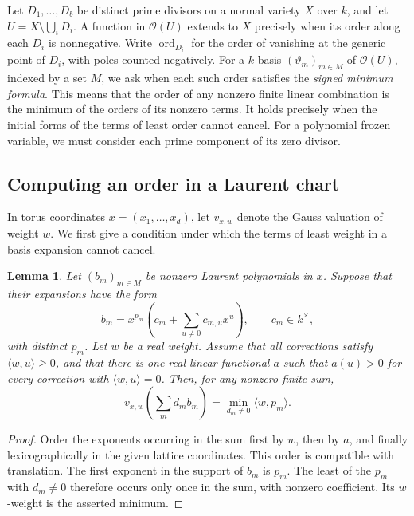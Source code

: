 \documentclass[11pt,reqno]{amsart}
\numberwithin{equation}{section}
\newtheorem{lemma}[theorem]{Lemma}
\theoremstyle{definition}
\theoremstyle{remark}
\DeclareMathOperator{\ord}{ord}
\begin{document}
Let \(D_1,\ldots,D_b\) be distinct prime divisors on a normal variety
\(X\) over \(k\), and let \(U=X\setminus\bigcup_iD_i\). A function
in \(\mathcal O(U)\) extends to \(X\) precisely when its order along
each \(D_i\) is nonnegative. Write \(\ord_{D_i}\) for the order of
vanishing at the generic point of \(D_i\), with poles counted negatively.
For a \(k\)-basis \((\vartheta_m)_{m\in M}\) of \(\mathcal O(U)\),
indexed by a set \(M\), we ask when each such order satisfies the
\emph{signed minimum formula}. This means that the order of any
nonzero finite linear combination is the minimum of the orders of its
nonzero terms. It holds precisely when the initial forms of the terms
of least order cannot cancel. For a polynomial
frozen variable, we must consider each prime component of its zero divisor.

\subsection{Computing an order in a Laurent chart}

In torus coordinates \(x=(x_1,\ldots,x_d)\), let \(v_{x,w}\) denote the
Gauss valuation of weight \(w\). We first give a condition under which
the terms of least weight in a basis expansion cannot cancel.

\begin{lemma}\label{lem:boundary-leading-independence}
Let \((b_m)_{m\in M}\) be nonzero Laurent polynomials in \(x\). Suppose
that their expansions have the form
\[ b_m=x^{p_m}\left(c_m+\sum_{u\ne0} c_{m,u}x^u\right), \qquad c_m\in k^\times, \]
with distinct \(p_m\). Let \(w\) be a real weight. Assume that all
corrections satisfy \(\langle w,u\rangle\ge0\), and that there is one
real linear functional \(a\) such that \(a(u)>0\) for every correction
with \(\langle w,u\rangle=0\). Then, for any nonzero finite sum,
\[ v_{x,w}\!\left(\sum_m d_m b_m\right) =\min_{d_m\ne0}\langle w,p_m\rangle . \]
\end{lemma}

\begin{proof}
Order the exponents occurring in the sum first by \(w\), then by
\(a\), and finally lexicographically in the given lattice coordinates.
This order is compatible with translation. The first exponent in the
support of \(b_m\) is \(p_m\). The least of the \(p_m\) with
\(d_m\ne0\) therefore occurs only once in the sum, with nonzero
coefficient. Its \(w\)-weight is the asserted minimum.
\end{proof}
\end{document}
